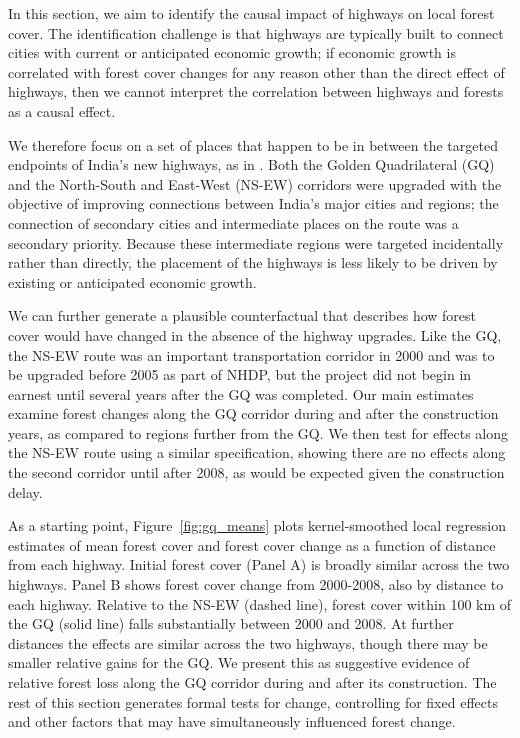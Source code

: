 In this section, we aim to identify the causal impact of highways on
local forest cover. The identification challenge is that highways are
typically built to connect cities with current or anticipated economic
growth; if economic growth is correlated with forest cover changes for
any reason other than the direct effect of highways, then we cannot
interpret the correlation between highways and forests as a causal
effect.

We therefore focus on a set of places that happen to be in between the
targeted endpoints of India's new highways, as in .
Both the Golden Quadrilateral (GQ) and the North-South and East-West
(NS-EW) corridors were upgraded with the objective of improving
connections between India's major cities and regions; the connection
of secondary cities and intermediate places on the route was a
secondary priority. Because these intermediate regions were targeted
incidentally rather than directly, the placement of the highways is
less likely to be driven by existing or anticipated economic growth.

We can further generate a plausible counterfactual that describes how
forest cover would have changed in the absence of the highway
upgrades. Like the GQ, the NS-EW route was an important transportation
corridor in 2000 and was to be upgraded before 2005 as part of NHDP, but
the project did not begin in earnest until several years after the GQ
was completed.  Our main estimates examine forest changes along the GQ
corridor during and after the construction years, as compared to
regions further from the GQ. We then test for effects along the NS-EW
route using a similar specification, showing there are no effects
along the second corridor until after 2008, as would be expected given
the construction delay.

As a starting point, Figure~\ref{fig:gq_means} plots kernel-smoothed
local regression estimates of mean forest cover and forest cover
change as a function of distance from each highway. Initial forest
cover (Panel A) is broadly similar across the two highways. Panel B
shows forest cover change from 2000-2008, also by distance to each
highway. Relative to the NS-EW (dashed line), forest cover within 100
km of the GQ (solid line) falls substantially between 2000 and
2008. At further distances the effects are similar across the two
highways, though there may be smaller relative gains for the GQ. We
present this as suggestive evidence of relative forest loss along the
GQ corridor during and after its construction. The rest of this
section generates formal tests for change, controlling for fixed
effects and other factors that may have simultaneously influenced
forest change.

